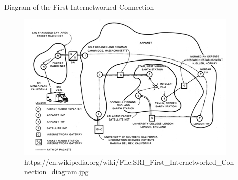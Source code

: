 \begin{frame}{Diagram of the First Internetworked Connection}
	\begin{figure}
		\includegraphics[width=300pt]{../common/images/SRI_First_Internetworked_Connection_diagram.jpg}\\
		{\scriptsize https://en.wikipedia.org/wiki/File:SRI\_First\_Internetworked\_Connection\_diagram.jpg}
	\end{figure}
\end{frame}

